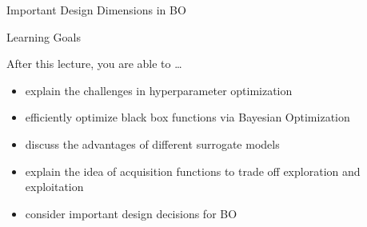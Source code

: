 {\begin{frame}[c,fragile]{Important Design Dimensions in BO}
\end{frame}
}
\begin{frame}[c]{Learning Goals}

After this lecture, you are able to \ldots

\begin{itemize}
	\item explain the \alert{challenges in hyperparameter optimization}
	\item efficiently optimize black box functions via \alert{Bayesian Optimization}
	\item discuss the advantages of different \alert{surrogate models}
	\item explain the idea of \alert{acquisition functions} to trade off exploration and exploitation
	\item consider important \alert{design decisions} for BO
\end{itemize}
\end{frame}


